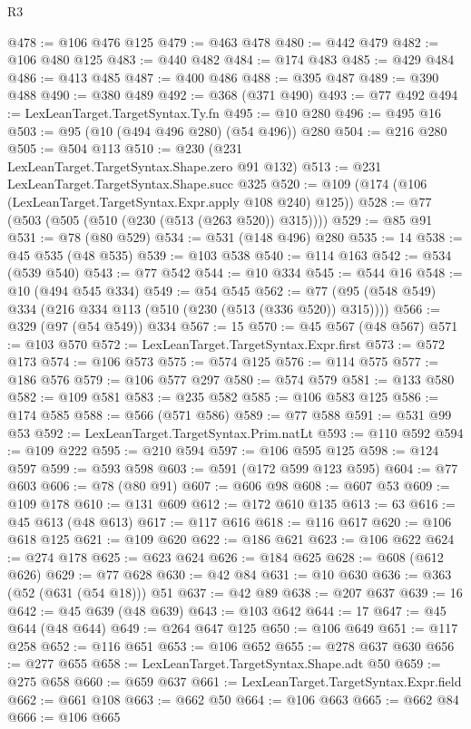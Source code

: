 \begin{lexlean}{R3}
\begin{coremodule}
@478 := @106 @476 @125
@479 := @463 @478
@480 := @442 @479
@482 := @106 @480 @125
@483 := @440 @482
@484 := @174 @483
@485 := @429 @484
@486 := @413 @485
@487 := @400 @486
@488 := @395 @487
@489 := @390 @488
@490 := @380 @489
@492 := @368 (@371 @490)
@493 := @77 @492
@494 := LexLeanTarget.TargetSyntax.Ty.fn
@495 := @10 @280
@496 := @495 @16
@503 := @95 (@10 (@494 @496 @280) (@54 @496)) @280
@504 := @216 @280
@505 := @504 @113
@510 := @230 (@231 LexLeanTarget.TargetSyntax.Shape.zero @91 @132)
@513 := @231 LexLeanTarget.TargetSyntax.Shape.succ @325
@520 := @109 (@174 (@106 (LexLeanTarget.TargetSyntax.Expr.apply @108 @240) @125))
@528 := @77 (@503 (@505 (@510 (@230 (@513 (@263 @520)) @315))))
@529 := @85 @91
@531 := @78 (@80 @529)
@534 := @531 (@148 @496) @280
@535 := 14
@538 := @45 @535 (@48 @535)
@539 := @103 @538
@540 := @114 @163
@542 := @534 (@539 @540)
@543 := @77 @542
@544 := @10 @334
@545 := @544 @16
@548 := @10 (@494 @545 @334)
@549 := @54 @545
@562 := @77 (@95 (@548 @549) @334 (@216 @334 @113 (@510 (@230 (@513 (@336 @520)) @315))))
@566 := @329 (@97 (@54 @549)) @334
@567 := 15
@570 := @45 @567 (@48 @567)
@571 := @103 @570
@572 := LexLeanTarget.TargetSyntax.Expr.first
@573 := @572 @173
@574 := @106 @573
@575 := @574 @125
@576 := @114 @575
@577 := @186 @576
@579 := @106 @577 @297
@580 := @574 @579
@581 := @133 @580
@582 := @109 @581
@583 := @235 @582
@585 := @106 @583 @125
@586 := @174 @585
@588 := @566 (@571 @586)
@589 := @77 @588
@591 := @531 @99 @53
@592 := LexLeanTarget.TargetSyntax.Prim.natLt
@593 := @110 @592
@594 := @109 @222
@595 := @210 @594
@597 := @106 @595 @125
@598 := @124 @597
@599 := @593 @598
@603 := @591 (@172 @599 @123 @595)
@604 := @77 @603
@606 := @78 (@80 @91)
@607 := @606 @98
@608 := @607 @53
@609 := @109 @178
@610 := @131 @609
@612 := @172 @610 @135
@613 := 63
@616 := @45 @613 (@48 @613)
@617 := @117 @616
@618 := @116 @617
@620 := @106 @618 @125
@621 := @109 @620
@622 := @186 @621
@623 := @106 @622
@624 := @274 @178
@625 := @623 @624
@626 := @184 @625
@628 := @608 (@612 @626)
@629 := @77 @628
@630 := @42 @84
@631 := @10 @630
@636 := @363 (@52 (@631 (@54 @18))) @51
@637 := @42 @89
@638 := @207 @637
@639 := 16
@642 := @45 @639 (@48 @639)
@643 := @103 @642
@644 := 17
@647 := @45 @644 (@48 @644)
@649 := @264 @647 @125
@650 := @106 @649
@651 := @117 @258
@652 := @116 @651
@653 := @106 @652
@655 := @278 @637 @630
@656 := @277 @655
@658 := LexLeanTarget.TargetSyntax.Shape.adt @50
@659 := @275 @658
@660 := @659 @637
@661 := LexLeanTarget.TargetSyntax.Expr.field
@662 := @661 @108
@663 := @662 @50
@664 := @106 @663
@665 := @662 @84
@666 := @106 @665

\end{coremodule}
\end{lexlean}
